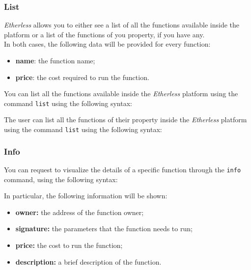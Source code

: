 \subsubsection{List}
\textit{Etherless} allows you to either see a list of all the functions available inside the platform or a list of the functions of you property, if you have any. \\
\noindent In both cases, the following data will be provided for every function:
\begin{itemize}
	\item \textbf{name}: the function name;
	\item \textbf{price}: the cost required to run the function.
\end{itemize}

You can list all the functions available inside the \textit{Etherless} platform using the command \texttt{list} using the following syntax:
\begin{center}
\end{center}
The user can list all the functions of their property inside the \textit{Etherless} platform using the command \texttt{list} using the following syntax:
\begin{center}
\end{center}

\subsubsection{Info}
You can request to visualize the details of a specific function through the \texttt{info} command, using the following syntax: \\
\begin{center}
\end{center}
In particular, the following information will be shown:
\begin{itemize}
	\item \textbf{owner: } the address of the function owner;
	\item \textbf{signature: } the parameters that the function needs to run;
	\item \textbf{price: } the cost to run the function;
	\item \textbf{description: } a brief description of the function.
\end{itemize}

